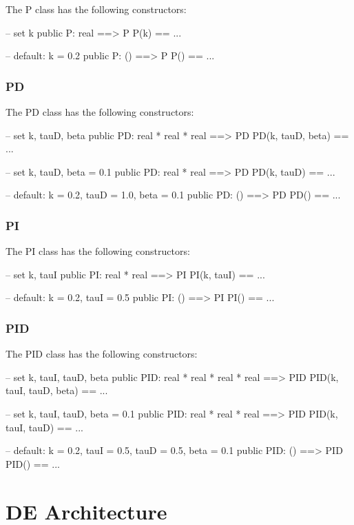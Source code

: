 \documentclass{crescendorepchap}
\begin{document}
The P class has the following constructors:

\begin{vdmrt}
-- set k
public P: real ==> P
P(k) == ...

-- default: k = 0.2
public P: () ==> P
P() == ...
\end{vdmrt}

\subsubsection{PD}

The PD class has the following constructors:

\begin{vdmrt}
-- set k, tauD, beta
public PD: real * real * real ==> PD
PD(k, tauD, beta) == ...

-- set k, tauD, beta = 0.1
public PD: real * real ==> PD
PD(k, tauD) == ...

-- default: k = 0.2, tauD = 1.0, beta = 0.1
public PD: () ==> PD
PD() == ...
\end{vdmrt}

\subsubsection{PI}

The PI class has the following constructors:

\begin{vdmrt}
-- set k, tauI
public PI: real * real ==> PI
PI(k, tauI) == ...

-- default: k = 0.2, tauI = 0.5
public PI: () ==> PI
PI() == ...
\end{vdmrt}

\subsubsection{PID}

The PID class has the following constructors:

\begin{vdmrt}
-- set k, tauI, tauD, beta
public PID: real * real * real * real ==> PID
PID(k, tauI, tauD, beta) == ...

-- set k, tauI, tauD, beta = 0.1
public PID: real * real * real ==> PID
PID(k, tauI, tauD) == ...

-- default: k = 0.2, tauI = 0.5, tauD = 0.5, beta = 0.1
public PID: () ==> PID
PID() == ...
\end{vdmrt}


\section{DE Architecture}\label{sec:DEArch}
\end{document}
